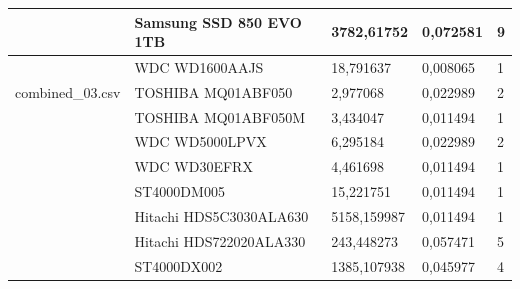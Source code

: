 \documentclass{VUMIFPSkursinis}
\begin{document}
\begin{table}[H]
{\begin{tabular}{|l|l|l|l|l|}
\cellcolor[HTML]{C0C0C0}              & Samsung SSD 850 EVO 1TB               & 3782,61752                             & 0,072581                             & 9                                    \\ \hline
\cellcolor[HTML]{C0C0C0}              & WDC WD1600AAJS                        & 18,791637                              & 0,008065                             & 1                                    \\ \hline
combined\_03.csv                      & TOSHIBA MQ01ABF050                    & 2,977068                               & 0,022989                             & 2                                    \\ \hline
\cellcolor[HTML]{C0C0C0}              & TOSHIBA MQ01ABF050M                   & 3,434047                               & 0,011494                             & 1                                    \\ \hline
\cellcolor[HTML]{C0C0C0}              & WDC WD5000LPVX                        & 6,295184                               & 0,022989                             & 2                                    \\ \hline
\cellcolor[HTML]{C0C0C0}              & WDC WD30EFRX                          & 4,461698                               & 0,011494                             & 1                                    \\ \hline
\cellcolor[HTML]{C0C0C0}              & ST4000DM005                           & 15,221751                              & 0,011494                             & 1                                    \\ \hline
\cellcolor[HTML]{C0C0C0}              & Hitachi HDS5C3030ALA630               & 5158,159987                            & 0,011494                             & 1                                    \\ \hline
\cellcolor[HTML]{C0C0C0}              & Hitachi HDS722020ALA330               & 243,448273                             & 0,057471                             & 5                                    \\ \hline
\cellcolor[HTML]{C0C0C0}              & ST4000DX002                           & 1385,107938                            & 0,045977                             & 4                                    \\ \hline
\end{tabular}}
\end{table}
\end{document}
